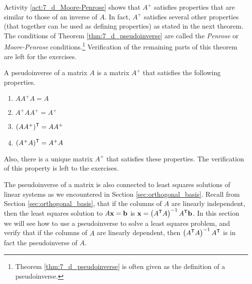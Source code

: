 Activity \ref{act:7_d_Moore-Penrose} shows that $A^{+}$ satisfies properties that are similar to those of an inverse of $A$. In fact, $A^{+}$ satisfies several other properties (that together can be used as defining properties) as stated in the next theorem. The conditions of Theorem \ref{thm:7_d_pseudoinverse} are called the \emph{Penrose} or \emph{Moore-Penrose} conditions.\footnote{Theorem \ref{thm:7_d_pseudoinverse} is often given as the definition of a pseudoinverse.} Verification of the remaining parts of this theorem are left for the exercises. 


\begin{theorem} \label{thm:7_d_pseudoinverse} A pseudoinverse of a matrix $A$ is a matrix $A^+$ that satisfies the following properties. 
\begin{enumerate}
\item $AA^{+}A = A$
\item $A^{+}AA^{+} = A^{+}$
\item $(AA^{+})^{\mathsf{T}} = AA^{+}$
\item $(A^{+}A)^{\mathsf{T}} = A^{+}A$
\end{enumerate}
\end{theorem} 
Also, there is a unique matrix $A^+$ that satisfies these properties. The verification of this property is left to the exercises. 


\label{sec:ls_approx}

The pseudoinverse of a matrix is also connected to least squares solutions of linear systems as we encountered in Section \ref{sec:orthogonal_basis}. Recall from Section \ref{sec:orthogonal_basis}, that if the columns of $A$ are linearly independent, then the least squares solution to $A\mathbf{x} = \mathbf{b}$ is $\mathbf{x} = \left(A^{\mathsf{T}}A\right)^{-1}A^{\mathsf{T}} \mathbf{b}$. In this section we will see how to use a pseudoinverse to solve a least squares problem, and verify that if the columns of $A$ are linearly dependent, then $ \left(A^{\mathsf{T}}A\right)^{-1}A^{\mathsf{T}}$ is in fact the pseudoinverse of $A$.  

